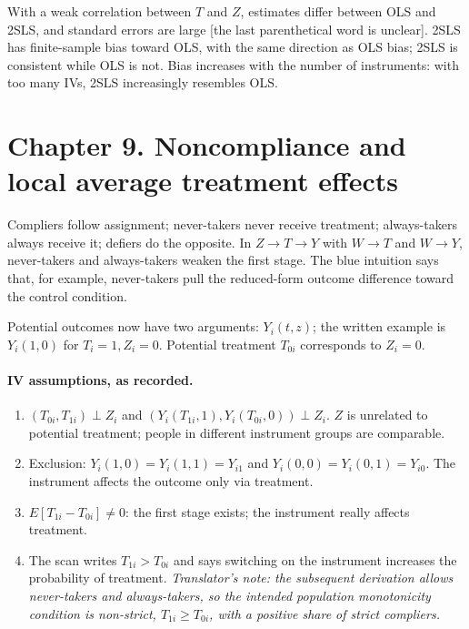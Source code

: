 With a weak correlation between $T$ and $Z$, estimates differ between OLS and 2SLS, and standard errors are large [the last parenthetical word is unclear]. 2SLS has finite-sample bias toward OLS, with the same direction as OLS bias; 2SLS is consistent while OLS is not. Bias increases with the number of instruments: with too many IVs, 2SLS increasingly resembles OLS.

\section{Chapter 9. Noncompliance and local average treatment effects}
Compliers follow assignment; never-takers never receive treatment; always-takers always receive it; defiers do the opposite. In $Z\to T\to Y$ with $W\to T$ and $W\to Y$, never-takers and always-takers weaken the first stage. The blue intuition says that, for example, never-takers pull the reduced-form outcome difference toward the control condition.

Potential outcomes now have two arguments: $Y_i(t,z)$; the written example is $Y_i(1,0)$ for $T_i=1,Z_i=0$. Potential treatment $T_{0i}$ corresponds to $Z_i=0$.
\paragraph{IV assumptions, as recorded.}
\begin{enumerate}
\item $(T_{0i},T_{1i})\perp Z_i$ and $(Y_i(T_{1i},1),Y_i(T_{0i},0))\perp Z_i$. $Z$ is unrelated to potential treatment; people in different instrument groups are comparable.
\item Exclusion: $Y_i(1,0)=Y_i(1,1)=Y_{i1}$ and $Y_i(0,0)=Y_i(0,1)=Y_{i0}$. The instrument affects the outcome only via treatment.
\item $E[T_{1i}-T_{0i}]\ne0$: the first stage exists; the instrument really affects treatment.
\item The scan writes $T_{1i}>T_{0i}$ and says switching on the instrument increases the probability of treatment. \textit{Translator's note: the subsequent derivation allows never-takers and always-takers, so the intended population monotonicity condition is non-strict, $T_{1i}\ge T_{0i}$, with a positive share of strict compliers.}
\end{enumerate}

